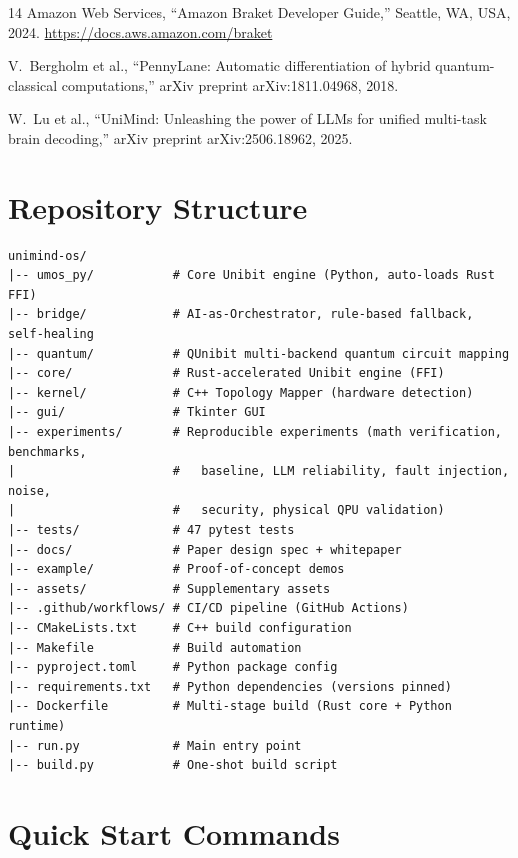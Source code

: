﻿\documentclass[12pt,a4paper]{article}
\begin{document}
\begin{thebibliography}{14}
Amazon Web Services,
``Amazon Braket Developer Guide,''
Seattle, WA, USA, 2024.
\url{https://docs.aws.amazon.com/braket}

V.~Bergholm et al.,
``PennyLane: Automatic differentiation of hybrid quantum-classical computations,''
arXiv preprint arXiv:1811.04968, 2018.

W.~Lu et al.,
``UniMind: Unleashing the power of LLMs for unified multi-task brain decoding,''
arXiv preprint arXiv:2506.18962, 2025.

\end{thebibliography}


\newpage
\appendix

\section{Repository Structure}

\begingroup
\footnotesize
\begin{verbatim}
unimind-os/
|-- umos_py/           # Core Unibit engine (Python, auto-loads Rust FFI)
|-- bridge/            # AI-as-Orchestrator, rule-based fallback, self-healing
|-- quantum/           # QUnibit multi-backend quantum circuit mapping
|-- core/              # Rust-accelerated Unibit engine (FFI)
|-- kernel/            # C++ Topology Mapper (hardware detection)
|-- gui/               # Tkinter GUI
|-- experiments/       # Reproducible experiments (math verification, benchmarks,
|                      #   baseline, LLM reliability, fault injection, noise,
|                      #   security, physical QPU validation)
|-- tests/             # 47 pytest tests
|-- docs/              # Paper design spec + whitepaper
|-- example/           # Proof-of-concept demos
|-- assets/            # Supplementary assets
|-- .github/workflows/ # CI/CD pipeline (GitHub Actions)
|-- CMakeLists.txt     # C++ build configuration
|-- Makefile           # Build automation
|-- pyproject.toml     # Python package config
|-- requirements.txt   # Python dependencies (versions pinned)
|-- Dockerfile         # Multi-stage build (Rust core + Python runtime)
|-- run.py             # Main entry point
|-- build.py           # One-shot build script
\end{verbatim}
\endgroup

\section{Quick Start Commands}
\end{document}
